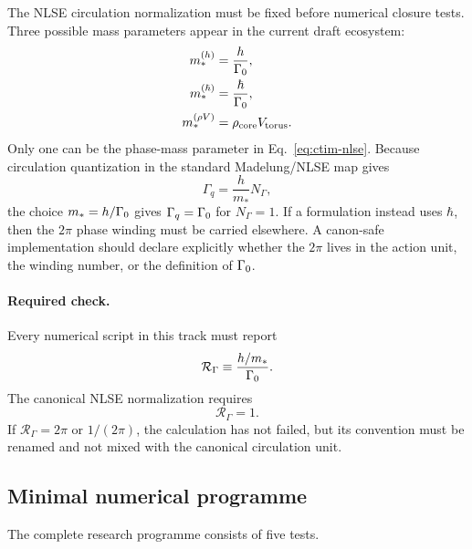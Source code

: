 The NLSE circulation normalization must be fixed before numerical closure tests.  Three possible mass parameters appear in the current draft ecosystem:
\begin{align}
    m_*^{(h)} &= \frac{h}{\Gamma_0},\\
    m_*^{(\hbar)} &= \frac{\hbar}{\Gamma_0},\\
    m_*^{(\rho V)} &= \rho_{\mathrm{core}} V_{\mathrm{torus}}.
\end{align}
Only one can be the phase-mass parameter in Eq.~\eqref{eq:ctim-nlse}.  Because circulation quantization in the standard Madelung/NLSE map gives
\begin{equation}
    \Gamma_q=\frac{h}{m_*}N_\Gamma,
\end{equation}
the choice \(m_*=h/\Gamma_0\) gives \(\Gamma_q=\Gamma_0\) for \(N_\Gamma=1\).  If a formulation instead uses \(\hbar\), then the \(2\pi\) phase winding must be carried elsewhere.  A canon-safe implementation should declare explicitly whether the \(2\pi\) lives in the action unit, the winding number, or the definition of \(\Gamma_0\).

\paragraph{Required check.}
Every numerical script in this track must report
\begin{equation}
    \mathcal R_\Gamma
    \equiv
    \frac{h/m_*}{\Gamma_0}.
\end{equation}
The canonical NLSE normalization requires
\begin{equation}
    \mathcal R_\Gamma=1.
\end{equation}
If \(\mathcal R_\Gamma=2\pi\) or \(1/(2\pi)\), the calculation has not failed, but its convention must be renamed and not mixed with the canonical circulation unit.

\subsection{Minimal numerical programme}
\label{subsec:ctim-numerical-programme}

The complete research programme consists of five tests.

